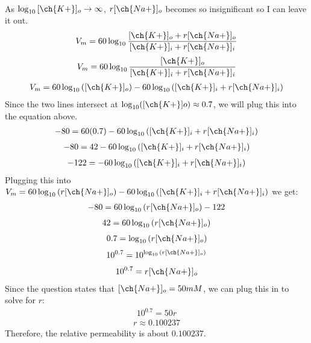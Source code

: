 \documentclass[11pt]{article}
\begin{document}
\begin{enumerate}[label=\arabic*.]
 \\
As $\log_{10}{[\ch{K+}]_o} \to \infty$, $r[\ch{Na+}]_o$ becomes so insignificant so I can leave it out.
\begin{align*}
V_m = 60\log_{10}{\frac{[\ch{K+}]_o + r[\ch{Na+}]_o} {[\ch{K+}]_i + r[\ch{Na+}]_i}}
\end{align*}
\begin{align*}
V_m = 60\log_{10}{\frac{[\ch{K+}]_o} {[\ch{K+}]_i + r[\ch{Na+}]_i}}
\end{align*}
\begin{align*}
V_m = 60\log_{10}{([\ch{K+}]_o)} - 60\log_{10}{([\ch{K+}]_i + r[\ch{Na+}]_i)}
\end{align*}
Since the two lines intersect at $\log_{10}([\ch{K+}]o) \approx 0.7$, we will plug this into the equation above.
\begin{align*}
-80 = 60(0.7) - 60\log_{10}{([\ch{K+}]_i + r[\ch{Na+}]_i)}
\end{align*}
\begin{align*}
-80 = 42 - 60\log_{10}{([\ch{K+}]_i + r[\ch{Na+}]_i)}
\end{align*}
\begin{align*}
-122 = - 60\log_{10}{([\ch{K+}]_i + r[\ch{Na+}]_i)}
\end{align*}
Plugging this into $V_m = 60\log_{10}{(r[\ch{Na+}]_o)} - 60\log_{10}{([\ch{K+}]_i + r[\ch{Na+}]_i)}$ we get:
\begin{align*}
-80 = 60\log_{10}{(r[\ch{Na+}]_o)} - 122
\end{align*}
\begin{align*}
42 = 60\log_{10}{(r[\ch{Na+}]_o)}
\end{align*}
\begin{align*}
0.7 = \log_{10}{(r[\ch{Na+}]_o)}
\end{align*}
\begin{align*}
10^{0.7} = 10^{\log_{10}{(r[\ch{Na+}]_o)}}
\end{align*}
\begin{align*}
10^{0.7} = r[\ch{Na+}]_o
\end{align*}
Since the question states that $[\ch{Na+}]_o = 50mM$, we can plug this in to solve for $r$:
\begin{align*}
10^{0.7} = 50r
\end{align*}
\begin{align*}
r \approx 0.100237
\end{align*}
Therefore, the relative permeability is about $0.100237$.




\end{enumerate}
\end{document}
